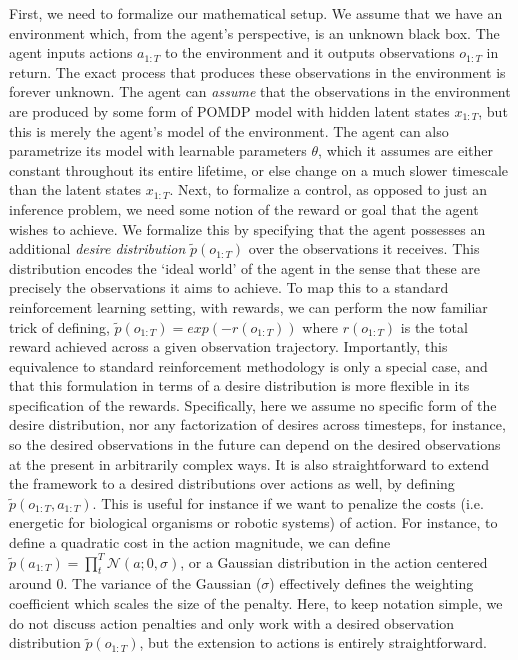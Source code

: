 First, we need to formalize our mathematical setup. We assume that we have an environment which, from the agent's perspective, is an unknown black box. The agent inputs actions $a_{1:T}$ to the environment and it outputs observations $o_{1:T}$ in return. The exact process that produces these observations in the environment is forever unknown. The agent can \emph{assume} that the observations in the environment are produced by some form of POMDP model with hidden latent states $x_{1:T}$, but this is merely the agent's model of the environment. The agent can also parametrize its model with learnable parameters $\theta$, which it assumes are either constant throughout its entire lifetime, or else change on a much slower timescale than the latent states $x_{1:T}$. Next, to formalize a control, as opposed to just an inference problem, we need some notion of the reward or goal that the agent wishes to achieve. We formalize this by specifying that the agent possesses an additional \emph{desire distribution} $\tilde{p}(o_{1:T})$ over the observations it receives. This distribution encodes the `ideal world' of the agent in the sense that these are precisely the observations it aims to achieve. To map this to a standard reinforcement learning setting, with rewards, we can perform the now familiar trick of defining, $\tilde{p}(o_{1:T}) = exp(-r(o_{1:T}))$ where $r(o_{1:T})$ is the total reward achieved across a given observation trajectory. Importantly, this equivalence to standard reinforcement methodology is only a special case, and that this formulation in terms of a desire distribution is more flexible in its specification of the rewards. Specifically, here we assume no specific form of the desire distribution, nor any factorization of desires across timesteps, for instance, so the desired observations in the future can depend on the desired observations at the present in arbitrarily complex ways. It is also straightforward to extend the framework to a desired distributions over actions as well, by defining $\tilde{p}(o_{1:T}, a_{1:T})$. This is useful for instance if we want to penalize the costs (i.e. energetic for biological organisms or robotic systems) of action. For instance, to define a quadratic cost in the action magnitude, we can define $\tilde{p}(a_{1:T}) = \prod_t^T \mathcal{N}(a; 0, \sigma)$, or a Gaussian distribution in the action centered around 0. The variance of the Gaussian ($\sigma$) effectively defines the weighting coefficient which scales the size of the penalty. Here, to keep notation simple, we do not discuss action penalties and only work with a desired observation distribution $\tilde{p}(o_{1:T})$, but the extension to actions is entirely straightforward.

